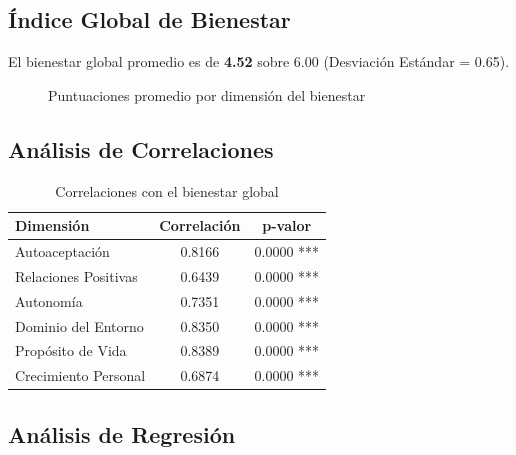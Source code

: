 \documentclass[12pt,a4paper]{article}
\begin{document}
\subsection{Índice Global de Bienestar}

El bienestar global promedio es de \textbf{4.52} sobre 6.00 
(Desviación Estándar = 0.65).

\begin{figure}[H]
\centering
{}
\caption{Puntuaciones promedio por dimensión del bienestar}
\label{fig:dimensiones}
\end{figure}


\subsection{Análisis de Correlaciones}

\begin{table}[H]
\centering
\caption{Correlaciones con el bienestar global}
\label{tab:correlaciones}
\begin{tabular}{@{}lcc@{}}
\toprule
\textbf{Dimensión} & \textbf{Correlación} & \textbf{p-valor} \\
\midrule
Autoaceptación & 0.8166 & 0.0000 *** \\
Relaciones Positivas & 0.6439 & 0.0000 *** \\
Autonomía & 0.7351 & 0.0000 *** \\
Dominio del Entorno & 0.8350 & 0.0000 *** \\
Propósito de Vida & 0.8389 & 0.0000 *** \\
Crecimiento Personal & 0.6874 & 0.0000 *** \\

\bottomrule
\end{tabular}
\end{table}


\subsection{Análisis de Regresión}
\end{document}

